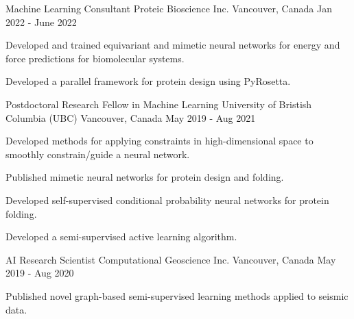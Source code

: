 

\begin{cventries}

  \cventry
    {Machine Learning Consultant} %
    {Proteic Bioscience Inc.} %
    {Vancouver, Canada} %
    {Jan 2022 - June 2022} %
    {
      \begin{cvitems} %
        \item {Developed and trained equivariant and mimetic neural networks for energy and force predictions for biomolecular systems.}
        \item {Developed a parallel framework for protein design using PyRosetta.}
      \end{cvitems}
    }

  \cventry
    {Postdoctoral Research Fellow in Machine Learning} %
    {University of Bristish Columbia (UBC)} %
    {Vancouver, Canada} %
    {May 2019 - Aug 2021} %
    {
      \begin{cvitems} %
        \item {Developed methods for applying constraints in high-dimensional space to smoothly constrain/guide a neural network.}
        \item {Published mimetic neural networks for protein design and folding.}
        \item {Developed self-supervised conditional probability neural networks for protein folding.}
        \item {Developed a semi-supervised active learning algorithm.}
      \end{cvitems}
    }

  \cventry
    {AI Research Scientist} %
    {Computational Geoscience Inc.} %
    {Vancouver, Canada} %
    {May 2019 - Aug 2020} %
    {
      \begin{cvitems} %
        \item {Published novel graph-based semi-supervised learning methods applied to seismic data.}
      \end{cvitems}
    }


\end{cventries}
